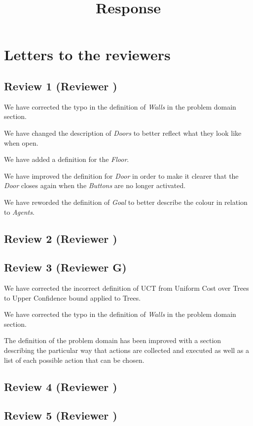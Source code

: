 \documentclass{article}
\title{Response}
\begin{document}
\maketitle
\section{Letters to the reviewers}
\subsection{Review 1 (Reviewer )}
We have corrected the typo in the definition of \emph{Walls} in the problem domain section.

We have changed the description of \emph{Doors} to better reflect what they look like when open.

We have added a definition for the \emph{Floor}.

We have improved the definition for \emph{Door} in order to make it clearer that the \emph{Door} closes again when the \emph{Buttons} are no longer activated.

We have reworded the definition of \emph{Goal} to better describe the colour in relation to \emph{Agents}.
\subsection{Review 2 (Reviewer )}
\subsection{Review 3 (Reviewer G)}
We have corrected the incorrect definition of UCT from Uniform Cost over Trees to Upper Confidence bound applied to Trees.

We have corrected the typo in the definition of \emph{Walls} in the problem domain section.

The definition of the problem domain has been improved with a section describing the particular way that actions are collected and executed as well as a list of each possible action that can be chosen.
\subsection{Review 4 (Reviewer )}
\subsection{Review 5 (Reviewer )}
\end{document}

